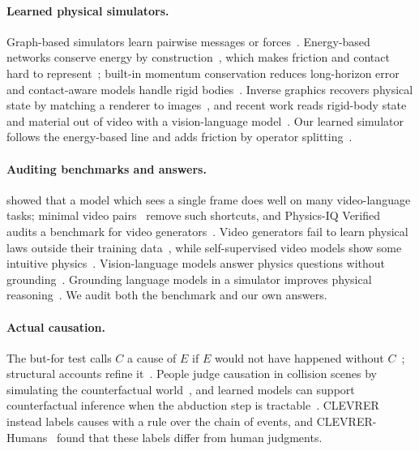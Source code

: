 \IfFileExists{TMLR}{\documentclass[10pt]{article}}%
\providecommand{\etal}{et al.}
\newcommand{\namecite}[2]{\citet{#2}}
\newcommand{\namecite}[2]{#1 \etal~\oldcitecompat{#2}}
\newcommand{\oldcitecompat}[1]{\cite{#1}}
\begin{document}
\paragraph{Learned physical simulators.}
Graph-based simulators learn pairwise messages or forces~\cite{battaglia2016interaction,li2019propnet,sanchez2020gns}.
Energy-based networks conserve energy by construction~\cite{greydanus2019hnn,cranmer2020lnn,sanchez2019hgn,wang2026moshwm}, which makes friction and contact hard to represent~\cite{sosanya2022dissipative,gruver2022deconstructing}; built-in momentum conservation reduces long-horizon error~\cite{sharma2026dynamical} and contact-aware models handle rigid bodies~\cite{allen2023fignet}.
Inverse graphics recovers physical state by matching a renderer to images~\cite{wu2015galileo,wu2017deanimation}, and recent work reads rigid-body state and material out of video with a vision-language model~\cite{kao2026dynamics}.
Our learned simulator follows the energy-based line and adds friction by operator splitting~\cite{hairer2006geometric}.

\paragraph{Auditing benchmarks and answers.}
\namecite{Buch}{buch2022revisiting} showed that a model which sees a single frame does well on many video-language tasks; minimal video pairs~\cite{krojer2025mvp} remove such shortcuts, and Physics-IQ Verified~\cite{radsch2026verified} audits a benchmark for video generators~\cite{motamed2026physicsiq}.
Video generators fail to learn physical laws outside their training data~\cite{kang2025howfar}, while self-supervised video models show some intuitive physics~\cite{garrido2025intuitive}.
Vision-language models answer physics questions without grounding~\cite{chow2025physbench,bagdonaviciute2025physics,bourigault2026words}.
Grounding language models in a simulator improves physical reasoning~\cite{liu2023mindseye,cherian2026llmphy,balazadeh2025pcb}.
We audit both the benchmark and our own answers.

\paragraph{Actual causation.}
The but-for test calls $C$ a cause of $E$ if $E$ would not have happened without $C$~\cite{lewis1973causation}; structural accounts refine it~\cite{halpern2005causes,halpern2016actual}.
People judge causation in collision scenes by simulating the counterfactual world~\cite{gerstenberg2021csm}, and learned models can support counterfactual inference when the abduction step is tractable~\cite{pawlowski2020deepscm,schoelkopf2021toward}.
CLEVRER instead labels causes with a rule over the chain of events, and CLEVRER-Humans~\cite{mao2022clevrerhumans} found that these labels differ from human judgments.
\end{document}
